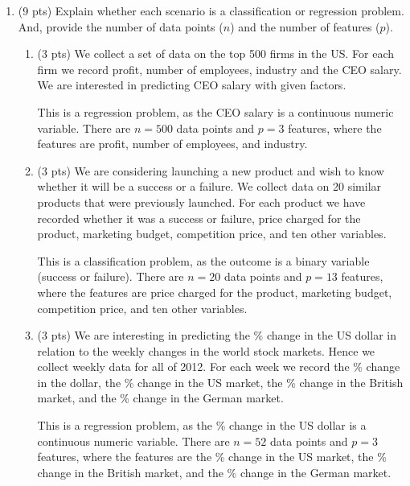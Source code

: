 \documentclass[a4paper]{article}
\theoremstyle{definition}
\newenvironment{soln}{
    \leavevmode\color{blue}\ignorespaces
}{}
\begin{document}
\begin{enumerate}
\item (9 pts) Explain whether each scenario is a classification or regression problem. And, provide the number of data points ($n$) and the number of features ($p$).

\begin{enumerate}
	\item (3 pts) We collect a set of data on the top 500 firms in the US. For each firm we record profit, number of employees, industry and the CEO salary. We are interested in predicting CEO salary with given factors.
	
	\begin{soln} 
		This is a regression problem, as the CEO salary is a continuous numeric variable. There are $n=500$ data points and $p=3$ features, where the features are profit, number of employees, and industry. 
	\end{soln}
	
	\item (3 pts) We are considering launching a new product and wish to know whether it will be a success or a failure. We collect data on 20 similar products that were previously launched. For each product we have recorded whether it was a success or failure, price charged for the product, marketing budget, competition price, and ten other variables.
	
	\begin{soln}
		This is a classification problem, as the outcome is a binary variable (success or failure). There are $n=20$ data points and $p=13$ features, where the features are price charged for the product, marketing budget, competition price, and ten other variables.
	\end{soln}
	
	\item (3 pts) We are interesting in predicting the \% change in the US dollar in relation to the weekly changes in the world stock markets. Hence we collect weekly data for all of 2012. For each week we record the \% change in the dollar, the \% change in the US market, the \% change in the British market, and the \% change in the German market.
	
	\begin{soln}
		This is a regression problem, as the \% change in the US dollar is a continuous numeric variable. There are $n=52$ data points and $p=3$ features, where the features are the \% change in the US market, the \% change in the British market, and the \% change in the German market.
	\end{soln}
	

\end{enumerate}
\end{enumerate}
\end{document}
